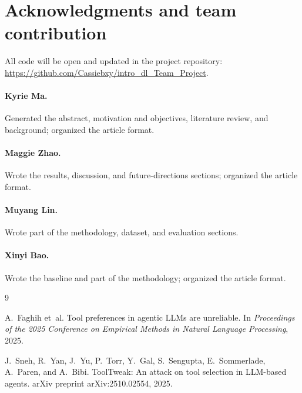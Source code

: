 \documentclass{article}
\begin{document}
\section*{Acknowledgments and team contribution}

All code will be open and updated in the project repository: \url{https://github.com/Cassiebxy/intro_dl_Team_Project}.

\paragraph{Kyrie Ma.} Generated the abstract, motivation and objectives, literature review, and background; organized the article format.
\paragraph{Maggie Zhao.} Wrote the results, discussion, and future-directions sections; organized the article format.
\paragraph{Muyang Lin.} Wrote part of the methodology, dataset, and evaluation sections.
\paragraph{Xinyi Bao.} Wrote the baseline and part of the methodology; organized the article format.

\begin{thebibliography}{9}

A.~Faghih et~al.
\newblock Tool preferences in agentic LLMs are unreliable.
\newblock In \emph{Proceedings of the 2025 Conference on Empirical Methods in Natural Language Processing}, 2025.

J.~Sneh, R.~Yan, J.~Yu, P.~Torr, Y.~Gal, S.~Sengupta, E.~Sommerlade,
A.~Paren, and A.~Bibi.
\newblock ToolTweak: An attack on tool selection in LLM-based agents.
\newblock arXiv preprint arXiv:2510.02554, 2025.

\end{thebibliography}
\end{document}
